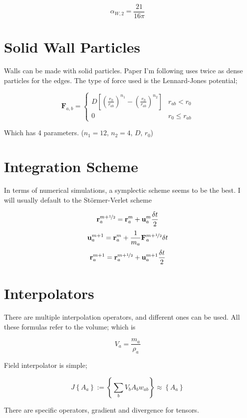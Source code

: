 \documentclass[12pt]{article}
\begin{document}
\[
    \alpha_{W,2} = \frac{21}{16\pi}
\]

\section{Solid Wall Particles}

Walls can be made with solid particles.
Paper I'm following uses twice as dense particles for the edges.
The type of force used is the Lennard-Jones potential;

\[
    \mathbf{F}_{a,b} = \left\{
        \begin{array}{cl}
            D \left[ { \left( \frac{r_0}{r_{ab}} \right) }^{n_1} -
                     { \left( \frac{r_0}{r_{ab}} \right) }^{n_2} \right] &
            r_{ab} < r_0 \\
            0 &
            r_0 \leq r_{ab} 
        \end{array} \right.
\]

Which has 4 parameters. ($n_1=12$, $n_2=4$, $D$, $r_0$)

\section{Integration Scheme}

In terms of numerical simulations, a symplectic scheme seems to be the best.
I will usually default to the Störmer-Verlet scheme

\[
    \mathbf{r}_{a}^{m+\nicefrac{1}{2}} =
    \mathbf{r}_{a}^{m} +
    \mathbf{u}_{a}^{m} \frac{\delta t}{2}
\]
\[
    \mathbf{u}_{a}^{m+1} =
    \mathbf{r}_{a}^{m} +
    \frac{1}{m_a} \mathbf{F}_{a}^{m+\nicefrac{1}{2}} \delta t
\]
\[
    \mathbf{r}_{a}^{m+1} =
    \mathbf{r}_{a}^{m+\nicefrac{1}{2}} +
    \mathbf{u}_{a}^{m+1} \frac{\delta t}{2}
\]

\section{Interpolators}

There are multiple interpolation operators, and different ones can be used.
All these formulas refer to the volume; which is

\[
    V_a = \frac{m_a}{\rho_a}
\]

Field interpolator is simple;

\[
    J \left\{ A_a \right\} := \left\{
        \sum\limits_{b} V_b A_b w_{ab}
    \right\} \approx
    \left\{ A_a \right\}
\]

There are specific operators, gradient and divergence for tensors.
\end{document}
